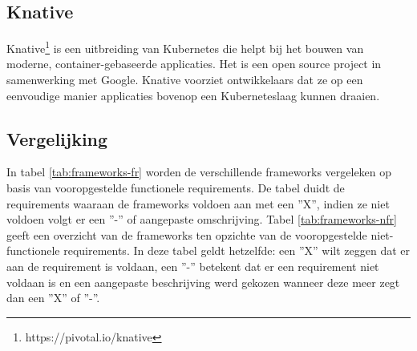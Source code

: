 \subsection{Knative}
Knative\footnote{https://pivotal.io/knative} is een uitbreiding van Kubernetes die helpt bij het bouwen van moderne, container-gebaseerde applicaties. Het is een open source project in samenwerking met Google. Knative voorziet ontwikkelaars dat ze op een eenvoudige manier applicaties bovenop een Kuberneteslaag kunnen draaien.

\subsection{Vergelijking}
In tabel \ref{tab:frameworks-fr} worden de verschillende frameworks vergeleken op basis van vooropgestelde functionele requirements.  De tabel duidt de requirements waaraan de frameworks voldoen aan met een ''X'', indien ze niet voldoen volgt er een ''-'' of aangepaste omschrijving. Tabel \ref{tab:frameworks-nfr} geeft een overzicht van de frameworks ten opzichte van de vooropgestelde niet-functionele requirements. In deze tabel geldt hetzelfde: een ''X'' wilt zeggen dat er aan de requirement is voldaan, een ''-'' betekent dat er een requirement niet voldaan is en een aangepaste beschrijving werd gekozen wanneer deze meer zegt dan een ''X'' of ''-''.


\begin{table}[]
    \centering
    \caption{Vergelijking open source serverless frameworks op basis van functionele requirements}
    \label{tab:frameworks-fr}
\end{table}

